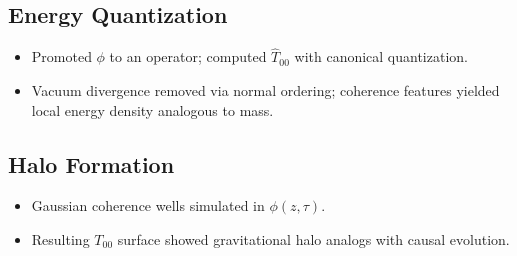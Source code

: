 \documentclass[11pt]{article}
\begin{document}
\subsection*{Energy Quantization}
\begin{itemize}
\item Promoted $\phi$ to an operator; computed $\hat{T}_{00}$ with canonical quantization.
\item Vacuum divergence removed via normal ordering; coherence features yielded local energy density analogous to mass.
\end{itemize}

\subsection*{Halo Formation}
\begin{itemize}
\item Gaussian coherence wells simulated in $\phi(z, \tau)$.
\item Resulting $T_{00}$ surface showed gravitational halo analogs with causal evolution.
\end{itemize}
\end{document}
